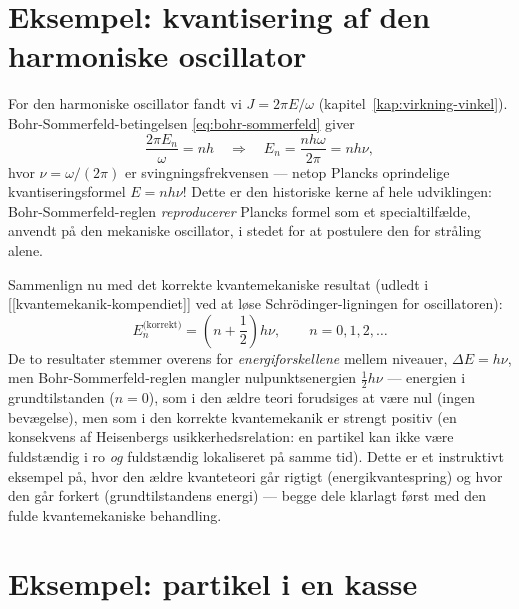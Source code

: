 \section{Eksempel: kvantisering af den harmoniske oscillator}

\begin{eksempel}
For den harmoniske oscillator fandt vi $J=2\pi E/\omega$
(kapitel~\ref{kap:virkning-vinkel}). Bohr-Sommerfeld-betingelsen
\eqref{eq:bohr-sommerfeld} giver
\begin{equation}
  \frac{2\pi E_n}{\omega} = nh
  \quad\Longrightarrow\quad
  E_n = \frac{nh\omega}{2\pi} = nh\nu,
\end{equation}
hvor $\nu=\omega/(2\pi)$ er svingningsfrekvensen — netop Plancks
oprindelige kvantiseringsformel $E=nh\nu$! Dette er den historiske
kerne af hele udviklingen: Bohr-Sommerfeld-reglen \emph{reproducerer}
Plancks formel som et specialtilfælde, anvendt på den mekaniske
oscillator, i stedet for at postulere den for stråling alene.

Sammenlign nu med det korrekte kvantemekaniske resultat (udledt i
[[kvantemekanik-kompendiet]] ved at løse Schrödinger-ligningen for
oscillatoren):
\begin{equation}
  E_n^{\text{(korrekt)}} = \left(n+\frac12\right)h\nu, \qquad n=0,1,2,\dots
\end{equation}
De to resultater stemmer overens for \emph{energiforskellene} mellem
niveauer, $\Delta E=h\nu$, men Bohr-Sommerfeld-reglen mangler
nulpunktsenergien $\frac12h\nu$ — energien i grundtilstanden
($n=0$), som i den ældre teori forudsiges at være nul (ingen
bevægelse), men som i den korrekte kvantemekanik er strengt positiv
(en konsekvens af Heisenbergs usikkerhedsrelation: en partikel kan
ikke være fuldstændig i ro \emph{og} fuldstændig lokaliseret på
samme tid). Dette er et instruktivt eksempel på, hvor den ældre
kvanteteori går rigtigt (energikvantespring) og hvor den går forkert
(grundtilstandens energi) — begge dele klarlagt først med den fulde
kvantemekaniske behandling.
\end{eksempel}

\section{Eksempel: partikel i en kasse}

